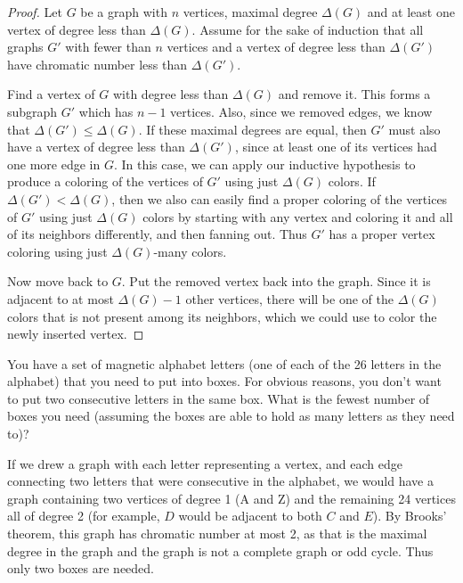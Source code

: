 \begin{questions}
	\begin{answer}
		\begin{proof}
		Let $G$ be a graph with $n$ vertices, maximal degree $\Delta(G)$ and at least one vertex of degree less than $\Delta(G)$.  Assume for the sake of induction that all graphs $G'$ with fewer than $n$ vertices and a vertex of degree less than $\Delta(G')$ have chromatic number less than $\Delta(G')$.
		
		Find a vertex of $G$ with degree less than $\Delta(G)$ and remove it.  This forms a subgraph $G'$ which has $n-1$ vertices.  Also, since we removed edges, we know that $\Delta(G') \le \Delta(G)$.  If these maximal degrees are equal, then $G'$ must also have a vertex of degree less than $\Delta(G')$, since at least one of its vertices had one more edge in $G$.  In this case, we can apply our inductive hypothesis to produce a coloring of the vertices of $G'$ using just $\Delta(G)$ colors.  If $\Delta(G') < \Delta(G)$, then we also can easily find a proper coloring of the vertices of $G'$ using just $\Delta(G)$ colors by starting with any vertex and coloring it and all of its neighbors differently, and then fanning out.  Thus $G'$ has a proper vertex coloring using just $\Delta(G)$-many colors.
		
		Now move back to $G$.  Put the removed vertex back into the graph.  Since it is adjacent to at most $\Delta(G) - 1$ other vertices, there will be one of the $\Delta(G)$ colors that is not present among its neighbors, which we could use to color the newly inserted vertex.
		\end{proof}
	\end{answer}
	
	
\question You have a set of magnetic alphabet letters (one of each of the 26 letters in the alphabet) that you need to put into boxes.  For obvious reasons, you don't want to put two consecutive letters in the same box.  What is the fewest number of boxes you need (assuming the boxes are able to hold as many letters as they need to)?

	\begin{answer}
		If we drew a graph with each letter representing a vertex, and each edge connecting two letters that were consecutive in the alphabet, we would have a graph containing two vertices of degree 1 (A and Z) and the remaining 24 vertices all of degree 2 (for example, $D$ would be adjacent to both $C$ and $E$).  By Brooks' theorem, this graph has chromatic number at most 2, as that is the maximal degree in the graph and the graph is not a complete graph or odd cycle.  Thus only two boxes are needed.
	\end{answer}



\end{questions}
